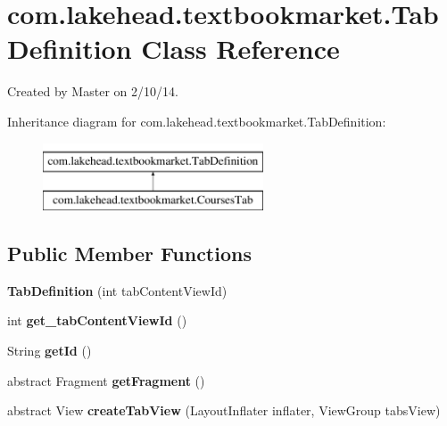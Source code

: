 \hypertarget{classcom_1_1lakehead_1_1textbookmarket_1_1_tab_definition}{\section{com.\-lakehead.\-textbookmarket.\-Tab\-Definition Class Reference}
\label{classcom_1_1lakehead_1_1textbookmarket_1_1_tab_definition}
}


Created by Master on 2/10/14.  


Inheritance diagram for com.\-lakehead.\-textbookmarket.\-Tab\-Definition\-:\begin{figure}[H]
\begin{center}
\leavevmode
\includegraphics[height=2.000000cm]{classcom_1_1lakehead_1_1textbookmarket_1_1_tab_definition}
\end{center}
\end{figure}
\subsection*{Public Member Functions}
\begin{DoxyCompactItemize}
\item 
\hypertarget{classcom_1_1lakehead_1_1textbookmarket_1_1_tab_definition_a6f5fe4163e749467117f47b16e96337a}{{\bfseries Tab\-Definition} (int tab\-Content\-View\-Id)}\label{classcom_1_1lakehead_1_1textbookmarket_1_1_tab_definition_a6f5fe4163e749467117f47b16e96337a}

\item 
\hypertarget{classcom_1_1lakehead_1_1textbookmarket_1_1_tab_definition_aef81e293ba05737cd75104b7966910ad}{int {\bfseries get\-\_\-tab\-Content\-View\-Id} ()}\label{classcom_1_1lakehead_1_1textbookmarket_1_1_tab_definition_aef81e293ba05737cd75104b7966910ad}

\item 
\hypertarget{classcom_1_1lakehead_1_1textbookmarket_1_1_tab_definition_aaa7b762c7f6beb4ee2568110a7e1a6c7}{String {\bfseries get\-Id} ()}\label{classcom_1_1lakehead_1_1textbookmarket_1_1_tab_definition_aaa7b762c7f6beb4ee2568110a7e1a6c7}

\item 
\hypertarget{classcom_1_1lakehead_1_1textbookmarket_1_1_tab_definition_a5857740a6d4f74ef913a3aa2cadabb1f}{abstract Fragment {\bfseries get\-Fragment} ()}\label{classcom_1_1lakehead_1_1textbookmarket_1_1_tab_definition_a5857740a6d4f74ef913a3aa2cadabb1f}

\item 
\hypertarget{classcom_1_1lakehead_1_1textbookmarket_1_1_tab_definition_afe325769f529e5c1c8bd280e013c1099}{abstract View {\bfseries create\-Tab\-View} (Layout\-Inflater inflater, View\-Group tabs\-View)}\label{classcom_1_1lakehead_1_1textbookmarket_1_1_tab_definition_afe325769f529e5c1c8bd280e013c1099}

\end{DoxyCompactItemize}


